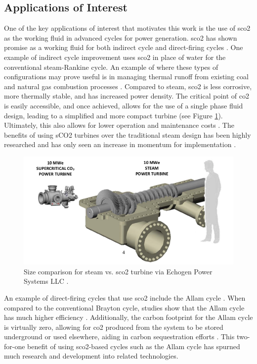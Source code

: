 \subsection{Applications of Interest}
One of the key applications of interest that motivates this work is the use of \gls{sco2} as the working fluid in advanced cycles for power generation. \gls{sco2} has shown promise as a working fluid for both indirect cycle and direct-firing cycles \cite{WEILAND2017293, WHITE2021116447}. One example of indirect cycle improvement uses \gls{sco2} in place of water for the conventional steam-Rankine cycle. An example of where these types of configurations may prove useful is in managing thermal runoff from existing coal and natural gas combustion processes \cite{WEILAND2017293}. Compared to steam, \gls{sco2} is less corrosive, more thermally stable, and has increased power density. The critical point of \gls{co2} is easily accessible, and once achieved, allows for the use of a single phase fluid design, leading to a simplified and more compact turbine (see Figure \ref{turbine_comp}). Ultimately, this also allows for lower operation and maintenance costs \cite{Dodge}. The benefits of using sCO2 turbines over the traditional steam design has been highly researched and has only seen an increase in momentum for implementation \cite{CRESPI2017152, NextGenNucReac, Dodge, commercialization}. 

\begin{figure}[h!]
\begin{center}
\includegraphics[scale=.5]{figures/steam_vs_sco2_turbine}
\end{center}
\caption{Size comparison for steam vs. \gls{sco2} turbine via Echogen Power Systems LLC \cite{commercialization}.}
\label{turbine_comp}
\end{figure}

An example of direct-firing cycles that use \gls{sco2} include the Allam cycle \cite{allam2013system}. When compared to the conventional Brayton cycle, studies show that the Allam cycle has much higher efficiency \cite{ALLAMCOMP, ALLAM20175948}. Additionally, the carbon footprint for the Allam cycle is virtually zero, allowing for \gls{co2} produced from the system to be stored underground or used elsewhere, aiding in carbon sequestration efforts \cite{cleantechnol1010022}. This two-for-one benefit of using \gls{sco2}-based cycles such as the Allam cycle has spurned much research \cite{ALLAMTech1, CHAN2021113972} and development \cite{8Rivers} into related technologies.

